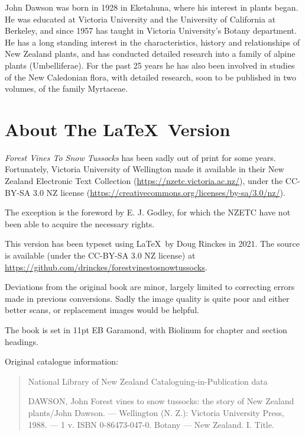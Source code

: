 John Dawson was born in 1928 in Eketahuna, where his interest in plants began.
He was educated at Victoria University and the University of California at Berkeley, and since 1957 has taught in Victoria University's Botany department.
He has a long standing interest in the characteristics, history and relationships of New Zealand plants, and has conducted detailed research into a family of alpine plants (Umbelliferae).
For the past 25 years he has also been involved in studies of the New Caledonian flora, with detailed research, soon to be published in two volumes, of the family Myrtaceae.

\section*{About The \LaTeX\ Version}

\emph{Forest Vines To Snow Tussocks} has been sadly out of print for some years.
Fortunately, Victoria University of Wellington made it available in their New Zealand Electronic Text Collection (\url{https://nzetc.victoria.ac.nz/}), under the CC-BY-SA 3.0 NZ license (\url{https://creativecommons.org/licenses/by-sa/3.0/nz/}).

The exception is the foreword by E. J. Godley, for which the NZETC have not been able to acquire the necessary rights.

This version has been typeset using \LaTeX\ by Doug Rinckes in 2021.
The source is available (under the CC-BY-SA 3.0 NZ license) at \url{https://github.com/drinckes/forestvinestosnowtussocks}.

Deviations from the original book are minor, largely limited to correcting errors made in previous conversions.
Sadly the image quality is quite poor and either better scans, or replacement images would be helpful.

The book is set in 11pt EB Garamond, with Biolinum for chapter and section headings.

Original catalogue information:

\begin{quote}
	National Library of New Zealand\newline
	Cataloguing-in-Publication data

	DAWSON, John\newline
	Forest vines to snow tussocks: the story of New Zealand plants/John Dawson. --- Wellington (N. Z.): Victoria University Press, 1988. --- 1 v.\newline
	ISBN 0-86473-047-0. Botany --- New Zealand. I. Title.\newline
\end{quote}


